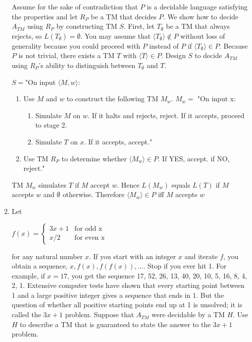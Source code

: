 \documentclass{article}
\begin{document}
\begin{enumerate}
        Assume for the sake of contradiction that $P$ is a decidable language satisfying the
        properties and let $R_P$ be a TM that decides $P$. We show how to decide $A_{TM}$ using
        $R_P$ by constructing TM $S$. First, let $T_{\emptyset}$ be a TM that always rejects, 
        so $L(T_{\emptyset})=\emptyset$.
        You may assume that $\langle T_{\emptyset} \rangle \not\in P$ without loss of generality 
        because you could proceed with $P$ instead of $P$ if $\langle T_{\emptyset} \rangle \in P$. 
        Because $P$ is not trivial, there exists a TM $T$ with $\langle T \rangle \in P$. Design $S$ 
        to decide $A_{TM}$ using $R_P$’s ability to distinguish between $T_{\emptyset}$ and $T$.\newline

        $S=$"On input $\langle M,w\rangle$:
        \begin{enumerate}[label = \arabic*., topsep=0pt]
            \item Use $M$ and $w$ to construct the following TM $M_w$.\newline
            $M_w=$ "On input x:
            \begin{enumerate}[label = \arabic*., topsep=0pt]
                \item Simulate $M$ on $w$. If it halts and rejects, reject. If it accepts, proceed to
                stage 2.
                \item Simulate $T$ on $x$. If it accepts, accept."
            \end{enumerate}
            \item Use TM $R_P$ to determine whether $\langle M_w \rangle\in P$. If YES, accept. if NO,
            reject."
        \end{enumerate}
        TM $M_w$ simulates $T$ if $M$ accept $w$. Hence $L(M_w)$ equals $L(T)$ if $M$ accepts $w$ and 
        $\emptyset$ otherwise. Therefore $\langle M_w \rangle \in P$ iff $M$ accepts $w$

        \item Let
        \begin{center}
            $f(x) = 
            \begin{cases} 
                3x+1 & \text{for odd x}\\
                x/2 & \text{for even x}
            \end{cases}$
        \end{center}
        for any natural number $x$. If you start with an integer $x$ and iterate $f$, you obtain a
        sequence, $x,f(x),f(f(x)),...$. Stop if you ever hit 1. For example, if $x = 17$, you
        get the sequence 17, 52, 26, 13, 40, 20, 10, 5, 16, 8, 4, 2, 1. Extensive computer
        tests have shown that every starting point between 1 and a large positive integer
        gives a sequence that ends in 1. But the question of whether all positive starting
        points end up at 1 is unsolved; it is called the $3x + 1$ problem.
        Suppose that $A_{TM}$ were decidable by a TM $H$. Use $H$ to describe a TM that is
        guaranteed to state the answer to the $3x + 1$ problem.\newline


\end{enumerate}
\end{document}
